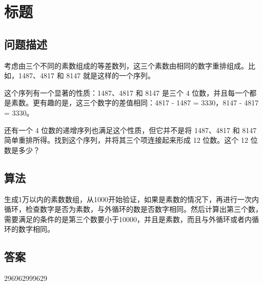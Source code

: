 \section{标题}
\subsection{问题描述}
\begin{tcolorbox}
考虑由三个不同的素数组成的等差数列，这三个素数由相同的数字重排组成。比如，1487、4817 和 8147 就是这样的一个序列。

这个序列有一个显著的性质：1487、4817 和 8147 是三个 4 位数，并且每一个都是素数。更有趣的是，这三个数字的差值相同：4817 - 1487 = 3330，8147 - 4817 = 3330。

还有一个 4 位数的递增序列也满足这个性质，但它并不是将 1487、4817 和 8147 简单重排所得。找到这个序列，并将其三个项连接起来形成 12 位数。这个 12 位数是多少？
\end{tcolorbox}

\subsection{算法}
生成1万以内的素数数组，从1000开始验证，如果是素数的情况下，再进行一次内循环，检查数字是否为素数，与外循环的数是否数字相同。然后计算出第三个数，需要满足的条件的是第三个数要小于10000，并且是素数，而且与外循环或者内循环的数字相同。

\subsection{答案}
296962999629
